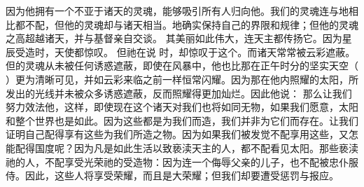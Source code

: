 因为他拥有一个不亚于诸天的灵魂，能够吸引所有人归向他。我们的灵魂连与地相比都不配，但他的灵魂却与诸天相当。地确实保持自己的界限和规律；但他的灵魂之高超越诸天，并与基督亲自交谈。 其美丽如此伟大，连天主都传扬它。因为星辰受造时，天使都惊叹。 但祂在说 时，却惊叹于这个。而诸天常常被云彩遮蔽。但的灵魂从未被任何诱惑遮蔽，即使在风暴中，他也比那在正午时分的坚实天空（ ）更为清晰可见，并如云彩来临之前一样恒常闪耀。因为那在他内照耀的太阳，所发出的光线并未被众多诱惑遮蔽，反而照耀得更加灿烂。因此他说：  那么让我们努力效法他，这样，即使现在这个诸天对我们也将如同无物，如果我们愿意，太阳和整个世界也是如此。因为这些都是为我们而造，我们并非为它们而存在。让我们证明自己配得享有这些为我们所造之物。因为如果我们被发觉不配享用这些，又怎能配得国度呢？因为凡是如此生活以致亵渎天主的人，都不配看见太阳。那些亵渎祂的人，不配享受光荣祂的受造物：因为连一个侮辱父亲的儿子，也不配被忠仆服侍。因此，这些人将享受荣耀，而且是大荣耀；但我们却要遭受惩罚与报应。\par

